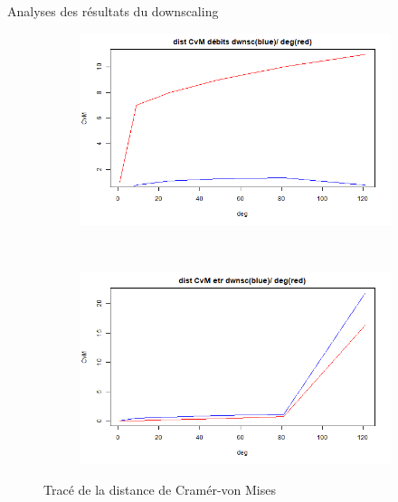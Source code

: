 \documentclass{beamer}
\numberwithin{equation}{section}
\begin{document}
	\begin{frame}{Analyses des résultats du downscaling}
		\begin{minipage}[b]{0.5\linewidth}
			\begin{figure}
				\label{fig-res_CVM_CDFt_deb}
				\centering
				\begin{subfigure}[b]{0.5\textwidth}
					\includegraphics[scale=0.2]{images/Dist_CVM_CDFt_deb.png}
				\end{subfigure}\\
				\begin{subfigure}[b]{0.5\textwidth}
					\includegraphics[scale=0.2]{images/Dist_CVM_CDFt_etr.png}
				\end{subfigure}
				\caption{Tracé de la distance de Cramér-von Mises}
			\end{figure}
		\end{minipage}\hfill
		\begin{minipage}[b]{0.5\linewidth}
			\begin{figure}

\end{figure}
\end{minipage}
\end{frame}
\end{document}
